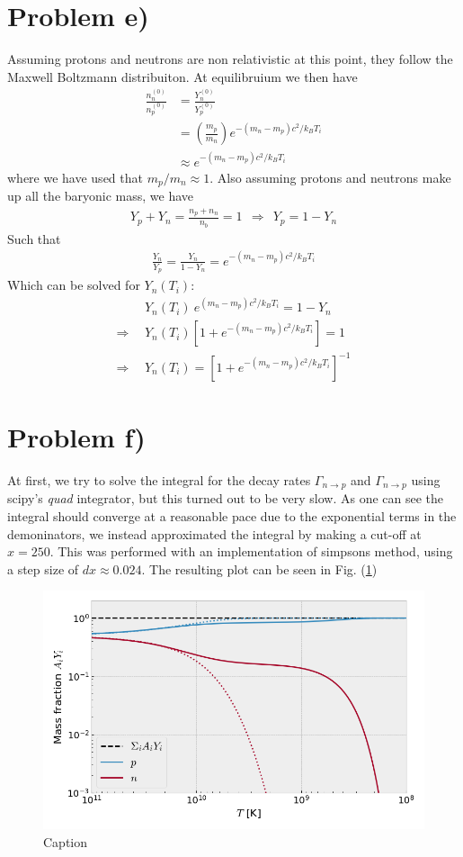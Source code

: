 \documentclass[reprint,english,notitlepage]{revtex4-1}  %
\numberwithin{equation}{section}
\begin{document}
\section{Problem e)}
Assuming protons and neutrons are non relativistic at this point, they follow
the Maxwell Boltzmann distribuiton. At equilibruium we then have
\begin{align}
	\frac{n^{(0)}_n}{n^{(0)}_p} &= \frac{Y^{(0)}_n}{Y^{(0)}_p} \\
			&= \left(\frac{m_p}{m_n}\right) e^{-(m_n - m_p)c^2/k_B T_i} \\
			&\approx e^{-(m_n - m_p)c^2/k_B T_i}
\end{align}
where we have used that $m_p/m_n \approx 1$. Also assuming protons and neutrons
make up all the baryonic mass, we have
\begin{align}
	Y_p + Y_n = \frac{n_p + n_n}{n_b} = 1 \ \ \Rightarrow \ \ Y_p = 1 - Y_n
\end{align}
Such that
\begin{align}
	\frac{Y_n}{Y_p} = \frac{Y_n}{1 - Y_n} = e^{-(m_n - m_p)c^2/k_B T_i}
\end{align}
Which can be solved for $Y_n(T_i)$:
\begin{align}
&Y_n(T_i)\ e^{(m_n - m_p)c^2/k_B T_i} = 1 - Y_n \\
\Rightarrow\ \  &Y_n(T_i) \left[1 + e^{-(m_n - m_p)c^2/k_B T_i}\right] = 1 \\
\Rightarrow\ \  &Y_n(T_i) = \left[1 + e^{-(m_n - m_p)c^2/k_B T_i}\right]^{-1}
\end{align}

\section{Problem f)}
At first, we try to solve the integral for the decay rates
$\Gamma_{n\rightarrow p}$ and $\Gamma_{n\rightarrow p}$ using scipy's
\textit{quad} integrator, but this turned out to be very slow.
As one can see the integral should converge at a reasonable pace due to the
exponential terms in the demoninators, we instead approximated the integral by
making a cut-off at $x=250$. This was performed with an  implementation of
simpsons method, using a step size of $dx\approx0.024$.
The resulting plot can be seen in Fig. (\ref{fig:problem_f})
\begin{figure}[h]
	\includegraphics[width=\columnwidth]{densities_f.png}
	\caption{Caption}
	\label{fig:problem_f}
\end{figure}
\end{document}
